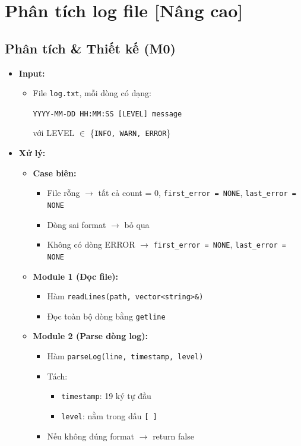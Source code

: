 \section{Phân tích log file [Nâng cao]}

\subsection{Phân tích \& Thiết kế (M0)}
\begin{itemize}
    \item \textbf{Input:}
    \begin{itemize}
        \item File \texttt{log.txt}, mỗi dòng có dạng:
        \begin{center}
        \texttt{YYYY-MM-DD HH:MM:SS [LEVEL] message}
        \end{center}
        với LEVEL $\in$ \{\texttt{INFO, WARN, ERROR}\}
    \end{itemize}

    \item \textbf{Xử lý:}
    \begin{itemize}
        \item \textbf{Case biên:}
        \begin{itemize}
            \item File rỗng $\rightarrow$ tất cả count = 0, \texttt{first\_error = NONE}, \texttt{last\_error = NONE}
            \item Dòng sai format $\rightarrow$ bỏ qua
            \item Không có dòng ERROR $\rightarrow$ \texttt{first\_error = NONE}, \texttt{last\_error = NONE}
        \end{itemize}

        \item \textbf{Module 1 (Đọc file):}
        \begin{itemize}
            \item Hàm \texttt{readLines(path, vector<string>\&)}
            \item Đọc toàn bộ dòng bằng \texttt{getline}
        \end{itemize}

        \item \textbf{Module 2 (Parse dòng log):}
        \begin{itemize}
            \item Hàm \texttt{parseLog(line, timestamp, level)}
            \item Tách:
            \begin{itemize}
                \item \texttt{timestamp}: 19 ký tự đầu
                \item \texttt{level}: nằm trong dấu \texttt{[ ]}
            \end{itemize}
            \item Nếu không đúng format $\rightarrow$ return false
        \end{itemize}


\end{itemize}
\end{itemize}

